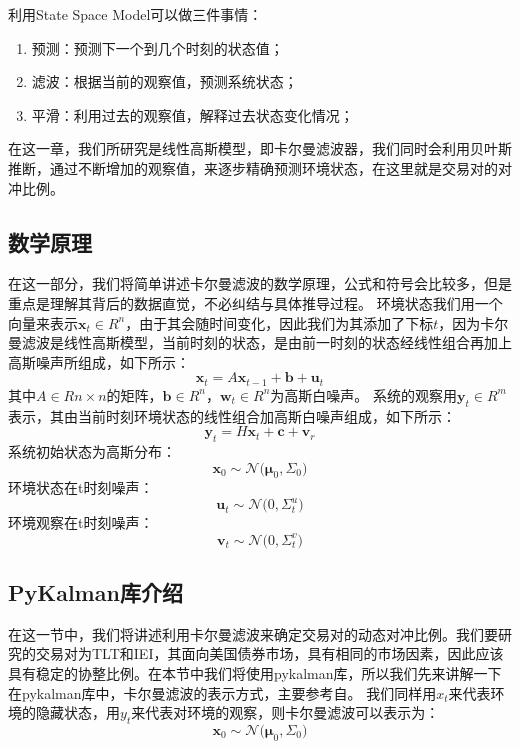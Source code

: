 利用State Space Model可以做三件事情：
\begin{enumerate}
\item 预测：预测下一个到几个时刻的状态值；
\item 滤波：根据当前的观察值，预测系统状态；
\item 平滑：利用过去的观察值，解释过去状态变化情况；
\end{enumerate}
在这一章，我们所研究是线性高斯模型，即卡尔曼滤波器，我们同时会利用贝叶斯推断，通过不断增加的观察值，来逐步精确预测环境状态，在这里就是交易对的对冲比例。\newline
\subsection{数学原理}
在这一部分，我们将简单讲述卡尔曼滤波的数学原理，公式和符号会比较多，但是重点是理解其背后的数据直觉，不必纠结与具体推导过程。\newline
环境状态我们用一个向量来表示$\boldsymbol{x}_{t} \in R^{n}$，由于其会随时间变化，因此我们为其添加了下标$t$，因为卡尔曼滤波是线性高斯模型，当前时刻的状态，是由前一时刻的状态经线性组合再加上高斯噪声所组成，如下所示：
\begin{equation}
\boldsymbol{x}_{t} = A\boldsymbol{x}_{t-1} + \boldsymbol{b} + \boldsymbol{u}_{t}
\label{e000065}
\end{equation}
其中$A \in R{n \times n}$的矩阵，$\boldsymbol{b} \in R^{n}$，$\boldsymbol{w}_{t} \in R^{n}$为高斯白噪声。\newline
系统的观察用$\boldsymbol{y}_t \in R^{m}$表示，其由当前时刻环境状态的线性组合加高斯白噪声组成，如下所示：
\begin{equation}
\boldsymbol{y}_{t} = H\boldsymbol{x}_{t} + \boldsymbol{c} + \boldsymbol{v}_{r}
\label{e000066}
\end{equation}
系统初始状态为高斯分布：
\begin{equation}
\boldsymbol{x}_{0} \sim \mathcal{N} \big( \boldsymbol{\mu}_{0}, \Sigma _{0} \big)
\label{e000067}
\end{equation}
环境状态在t时刻噪声：
\begin{equation}
\boldsymbol{u}_{t} \sim \mathcal{N} \big( 0, \Sigma _{t}^{u} \big)
\label{e000068}
\end{equation}
环境观察在t时刻噪声：
\begin{equation}
\boldsymbol{v}_{t} \sim \mathcal{N} \big( 0, \Sigma _{t}^{v} \big)
\label{e000069}
\end{equation}
\subsection{PyKalman库介绍}
在这一节中，我们将讲述利用卡尔曼滤波来确定交易对的动态对冲比例。我们要研究的交易对为TLT和IEI，其面向美国债券市场，具有相同的市场因素，因此应该具有稳定的协整比例。在本节中我们将使用pykalman库，所以我们先来讲解一下在pykalman库中，卡尔曼滤波的表示方式，主要参考自\cite{r000003}。\newline
我们同样用$x_{t}$来代表环境的隐藏状态，用$y_{t}$来代表对环境的观察，则卡尔曼滤波可以表示为：
\begin{equation}
\boldsymbol{x}_{0} \sim \mathcal{N} \big( \boldsymbol{\mu}_{0}, \Sigma _{0} \big)
\label{e000070}
\end{equation}

